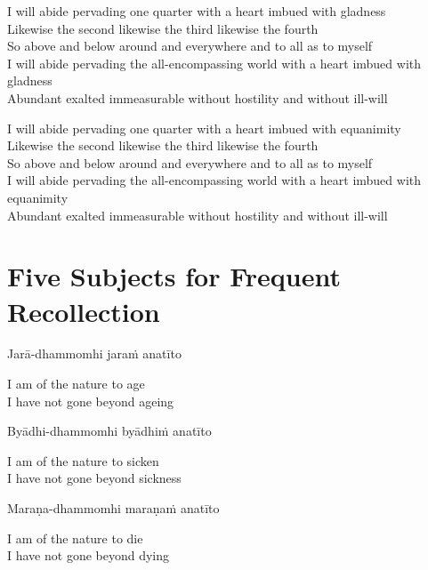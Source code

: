 I will abide pervading one quarter with a heart imbued with gladness\\
Likewise the second likewise the third likewise the fourth\\
So above and below around and everywhere and to all as to myself\\
I will abide pervading the all-encompassing world with a heart imbued with gladness\\
Abundant exalted immeasurable without hostility and without ill-will

I will abide pervading one quarter with a heart imbued with equanimity\\
Likewise the second likewise the third likewise the fourth\\
So above and below around and everywhere and to all as to myself\\
I will abide pervading the all-encompassing world with a heart imbued with equanimity\\
Abundant exalted immeasurable without hostility and without ill-will


\clearpage

\section{Five Subjects for Frequent Recollection}

\begin{leader}
\end{leader}

Jarā-dhammomhi jaraṁ anatīto

\begin{english}
  I am of the nature to age\\
  I have not gone beyond ageing
\end{english}

Byādhi-dhammomhi byādhiṁ anatīto

\begin{english}
  I am of the nature to sicken\\
  I have not gone beyond sickness
\end{english}

Maraṇa-dhammomhi maraṇaṁ anatīto

\begin{english}
  I am of the nature to die\\
  I have not gone beyond dying
\end{english}

